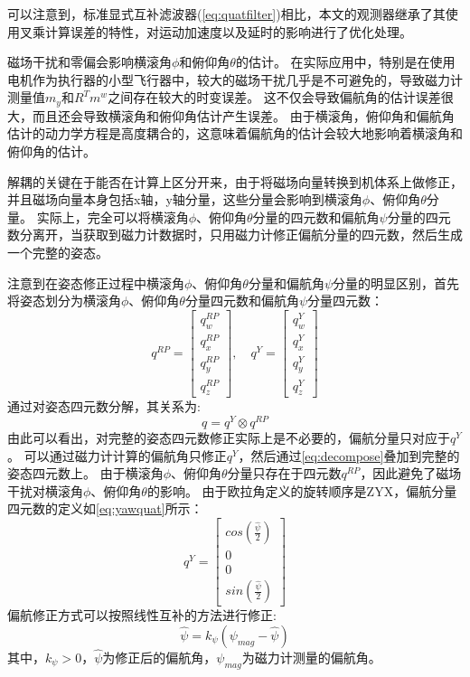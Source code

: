 \documentclass[
  type=master
]{gdutthesis}
\begin{document}
可以注意到，标准显式互补滤波器(\autoref{eq:quatfilter})相比，本文的观测器继承了其使用叉乘计算误差的特性，对运动加速度以及延时的影响进行了优化处理。

磁场干扰和零偏会影响横滚角$\phi$和俯仰角$\theta$的估计。
在实际应用中，特别是在使用电机作为执行器的小型飞行器中，较大的磁场干扰几乎是不可避免的，导致磁力计测量值$m_y$和$R^T m^w$之间存在较大的时变误差。
这不仅会导致偏航角的估计误差很大，而且还会导致横滚角和俯仰角估计产生误差。
由于横滚角，俯仰角和偏航角估计的动力学方程是高度耦合的，这意味着偏航角的估计会较大地影响着横滚角和俯仰角的估计。

解耦的关键在于能否在计算上区分开来，由于将磁场向量转换到机体系上做修正，并且磁场向量本身包括x轴，y轴分量，这些分量会影响到横滚角$\phi$、俯仰角$\theta$分量。
实际上，完全可以将横滚角$\phi$、俯仰角$\theta$分量的四元数和偏航角$\psi$分量的四元数分离开，当获取到磁力计数据时，只用磁力计修正偏航分量的四元数，然后生成一个完整的姿态。

注意到在姿态修正过程中横滚角$\phi$、俯仰角$\theta$分量和偏航角$\psi$分量的明显区别，首先将姿态划分为横滚角$\phi$、俯仰角$\theta$分量四元数和偏航角$\psi$分量四元数：\vspace{1ex}
\[
q^{RP} = 
\begin{bmatrix}
	q_w^{RP} \\
	q_x^{RP} \\
	q_y^{RP} \\
	q_z^{RP}
\end{bmatrix},
\hspace{1em}
q^{Y} = 
\begin{bmatrix}
	q_w^{Y} \\
	q_x^{Y} \\
	q_y^{Y} \\
	q_z^{Y}
\end{bmatrix}
\]
通过对姿态四元数分解，其关系为:
\begin{equation}\label{eq:decompose}
	q = q^{Y} \otimes q^{RP}	
\end{equation}
由此可以看出，对完整的姿态四元数修正实际上是不必要的，偏航分量只对应于$q^{Y}$。
可以通过磁力计计算的偏航角只修正$q^{Y}$，然后通过\autoref{eq:decompose}叠加到完整的姿态四元数上。
由于横滚角$\phi$、俯仰角$\theta$分量只存在于四元数$q^{RP}$，因此避免了磁场干扰对横滚角$\phi$、俯仰角$\theta$的影响。
由于欧拉角定义的旋转顺序是ZYX，偏航分量四元数的定义如\autoref{eq:yawquat}所示：
\begin{equation}\label{eq:yawquat}
	q^{Y} = 
	\begin{bmatrix}
		cos(\frac{\hat{\psi}}{2}) \\
		0 \\
		0 \\
		sin(\frac{\hat{\psi}}{2})
	\end{bmatrix}	
\end{equation}
偏航修正方式可以按照线性互补的方法进行修正:
\begin{equation}
	\hat{\psi} = k_{\psi} (\psi_{mag} - \hat{\psi}) 	
\end{equation}
其中，$k_{\psi} > 0$，$\hat{\psi}$为修正后的偏航角，$\psi_{mag}$为磁力计测量的偏航角。
\end{document}
